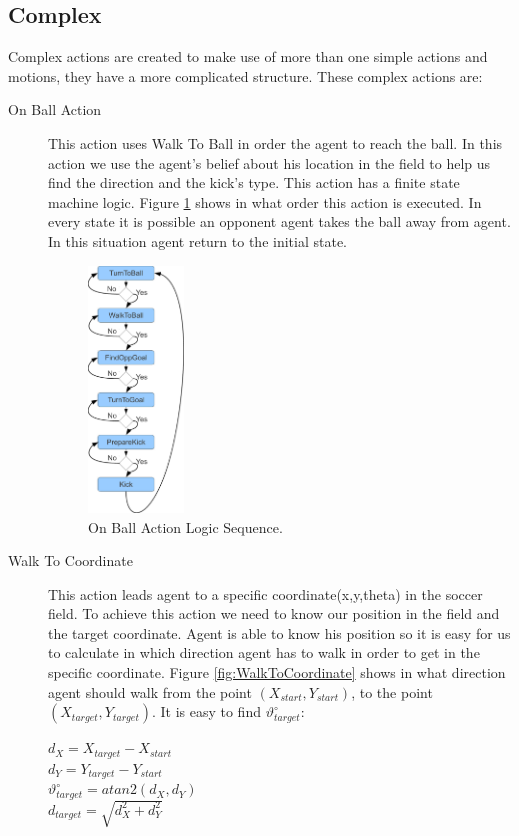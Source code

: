 \subsection{Complex}
Complex actions are created to make use of more than one simple actions and motions, they have a more complicated structure. These complex actions are:
\begin{description}
 \item[On Ball Action] This action uses Walk To Ball in order the agent to reach the ball. In this action we use the agent's belief about his location in the field to help us find the direction and the kick's type. This action has a finite state machine logic. Figure \ref{fig:GoKickBallToGoal} shows in what order this action is executed. In every state it is possible an opponent agent takes the ball away from agent. In this situation agent return to the initial state.
 \begin{figure}[!h]
\centering
  \includegraphics[width=0.25\textwidth]{Chapter3/figures/KickFSM.pdf}
  \caption{On Ball Action Logic Sequence.}
  \label{fig:GoKickBallToGoal}
\end{figure}
 \item[Walk To Coordinate]
 This action leads agent to a specific coordinate(x,y,theta) in the soccer field. To achieve this action we need to know our position in the field and the target coordinate. Agent is able to know his position so it is easy for us to calculate in which direction agent has to walk in order to get in the specific coordinate. Figure \ref{fig:WalkToCoordinate} shows in what direction agent should walk from the point $(X_{start},Y_{start})$, to the point $(X_{target},Y_{target})$. It is easy to find $\vartheta_{target}^{\circ}$:\\
\begin{center}
$d_{X} = X_{target} - X_{start}$\\
$d_{Y} = Y_{target} - Y_{start}$\\
$\vartheta_{target}^{\circ} = atan2(d_{X},d_{Y})$\\
$d_{target} = \sqrt{d_{X}^2 + d_{Y}^2}$
\end{center}


\end{description}
